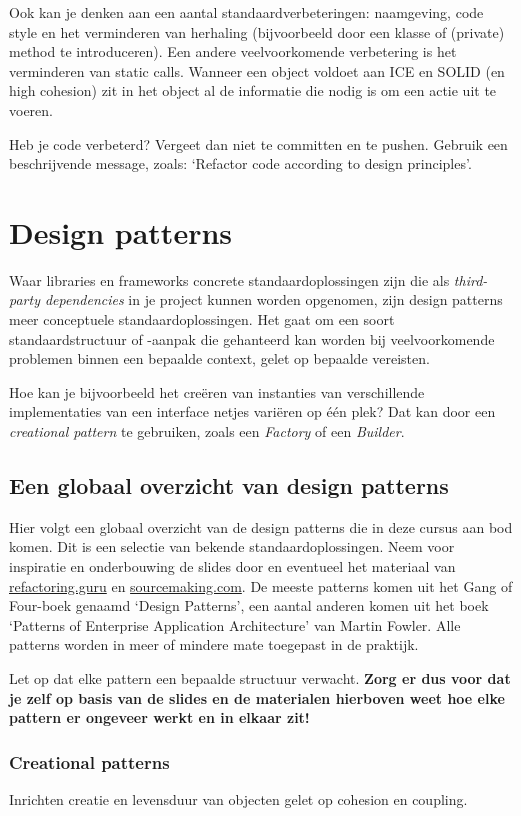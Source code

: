 Ook kan je denken aan een aantal standaardverbeteringen:
naamgeving, code style en het verminderen van herhaling
(bijvoorbeeld door een klasse of (private) method te introduceren).
Een andere veelvoorkomende verbetering is het verminderen van static calls.
Wanneer een object voldoet aan ICE en SOLID (en high cohesion) zit 
in het object al de informatie die nodig is om een actie uit te voeren.

Heb je code verbeterd? Vergeet dan niet te committen en te pushen. Gebruik een 
beschrijvende message, zoals: `Refactor code according to design principles'.

\newpage
\section{Design patterns}
Waar libraries en frameworks concrete standaardoplossingen zijn die als 
\textit{third-party dependencies} in je project kunnen worden opgenomen,
zijn design patterns meer conceptuele standaardoplossingen. Het gaat om 
een soort standaardstructuur of -aanpak die gehanteerd kan worden bij 
veelvoorkomende problemen binnen een bepaalde context, gelet op bepaalde 
vereisten.

Hoe kan je bijvoorbeeld het creëren van instanties van verschillende implementaties van 
een interface netjes variëren op één plek? 
Dat kan door een \textit{creational pattern} te gebruiken,
zoals een \textit{Factory} of een \textit{Builder}.

\subsection{Een globaal overzicht van design patterns}
Hier volgt een globaal overzicht van de design patterns die in deze 
cursus aan bod komen. Dit is een selectie van bekende standaardoplossingen. 
Neem voor inspiratie en onderbouwing de slides door 
en eventueel het materiaal van \url{refactoring.guru} en \url{sourcemaking.com}.
De meeste patterns komen uit het Gang of Four-boek genaamd `Design Patterns',
een aantal anderen komen uit het boek `Patterns of Enterprise Application Architecture' van 
Martin Fowler. Alle patterns worden in meer of mindere mate toegepast in de praktijk.

Let op dat elke pattern een bepaalde structuur verwacht.
\textbf{Zorg er dus voor dat je zelf op basis van de slides
en de materialen hierboven weet hoe elke pattern er 
ongeveer werkt en in elkaar zit!}

\subsubsection{Creational patterns}
Inrichten creatie en levensduur van objecten
gelet op cohesion en coupling.

